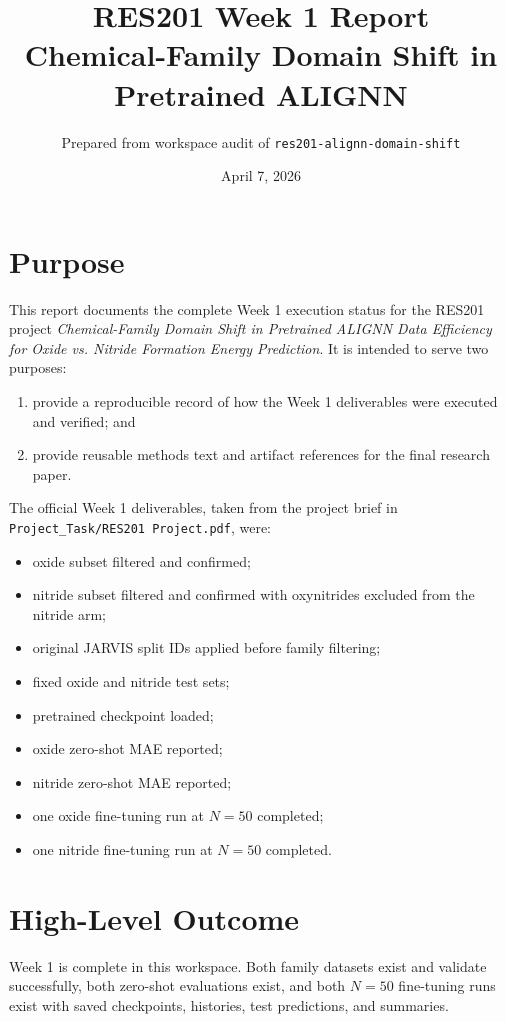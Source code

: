 \documentclass[11pt]{article}
\title{RES201 Week 1 Report\\Chemical-Family Domain Shift in Pretrained ALIGNN}
\author{Prepared from workspace audit of \texttt{res201-alignn-domain-shift}}
\date{April 7, 2026}
\begin{document}
\maketitle

\section{Purpose}
This report documents the complete Week 1 execution status for the RES201 project
\textit{Chemical-Family Domain Shift in Pretrained ALIGNN Data Efficiency for Oxide vs. Nitride Formation Energy Prediction}.
It is intended to serve two purposes:
\begin{enumerate}
  \item provide a reproducible record of how the Week 1 deliverables were executed and verified; and
  \item provide reusable methods text and artifact references for the final research paper.
\end{enumerate}

The official Week 1 deliverables, taken from the project brief in
\texttt{Project\_Task/RES201 Project.pdf}, were:
\begin{itemize}
  \item oxide subset filtered and confirmed;
  \item nitride subset filtered and confirmed with oxynitrides excluded from the nitride arm;
  \item original JARVIS split IDs applied before family filtering;
  \item fixed oxide and nitride test sets;
  \item pretrained checkpoint loaded;
  \item oxide zero-shot MAE reported;
  \item nitride zero-shot MAE reported;
  \item one oxide fine-tuning run at $N=50$ completed;
  \item one nitride fine-tuning run at $N=50$ completed.
\end{itemize}

\section{High-Level Outcome}
Week 1 is complete in this workspace. Both family datasets exist and validate successfully, both zero-shot evaluations exist, and both $N=50$ fine-tuning runs exist with saved checkpoints, histories, test predictions, and summaries.
\end{document}
